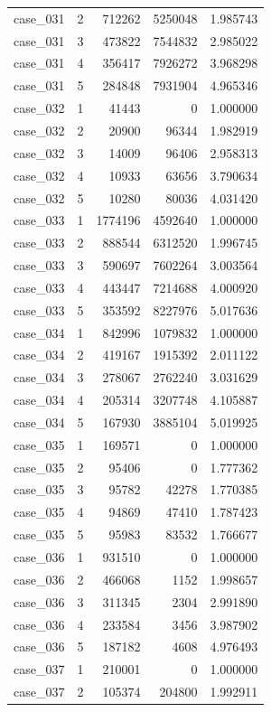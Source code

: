 \begin{longtable}{lrrrr}
case\_031 & 2 & 712262 & 5250048 & 1.985743 \\
case\_031 & 3 & 473822 & 7544832 & 2.985022 \\
case\_031 & 4 & 356417 & 7926272 & 3.968298 \\
case\_031 & 5 & 284848 & 7931904 & 4.965346 \\
case\_032 & 1 & 41443 & 0 & 1.000000 \\
case\_032 & 2 & 20900 & 96344 & 1.982919 \\
case\_032 & 3 & 14009 & 96406 & 2.958313 \\
case\_032 & 4 & 10933 & 63656 & 3.790634 \\
case\_032 & 5 & 10280 & 80036 & 4.031420 \\
case\_033 & 1 & 1774196 & 4592640 & 1.000000 \\
case\_033 & 2 & 888544 & 6312520 & 1.996745 \\
case\_033 & 3 & 590697 & 7602264 & 3.003564 \\
case\_033 & 4 & 443447 & 7214688 & 4.000920 \\
case\_033 & 5 & 353592 & 8227976 & 5.017636 \\
case\_034 & 1 & 842996 & 1079832 & 1.000000 \\
case\_034 & 2 & 419167 & 1915392 & 2.011122 \\
case\_034 & 3 & 278067 & 2762240 & 3.031629 \\
case\_034 & 4 & 205314 & 3207748 & 4.105887 \\
case\_034 & 5 & 167930 & 3885104 & 5.019925 \\
case\_035 & 1 & 169571 & 0 & 1.000000 \\
case\_035 & 2 & 95406 & 0 & 1.777362 \\
case\_035 & 3 & 95782 & 42278 & 1.770385 \\
case\_035 & 4 & 94869 & 47410 & 1.787423 \\
case\_035 & 5 & 95983 & 83532 & 1.766677 \\
case\_036 & 1 & 931510 & 0 & 1.000000 \\
case\_036 & 2 & 466068 & 1152 & 1.998657 \\
case\_036 & 3 & 311345 & 2304 & 2.991890 \\
case\_036 & 4 & 233584 & 3456 & 3.987902 \\
case\_036 & 5 & 187182 & 4608 & 4.976493 \\
case\_037 & 1 & 210001 & 0 & 1.000000 \\
case\_037 & 2 & 105374 & 204800 & 1.992911 \\

\end{longtable}
